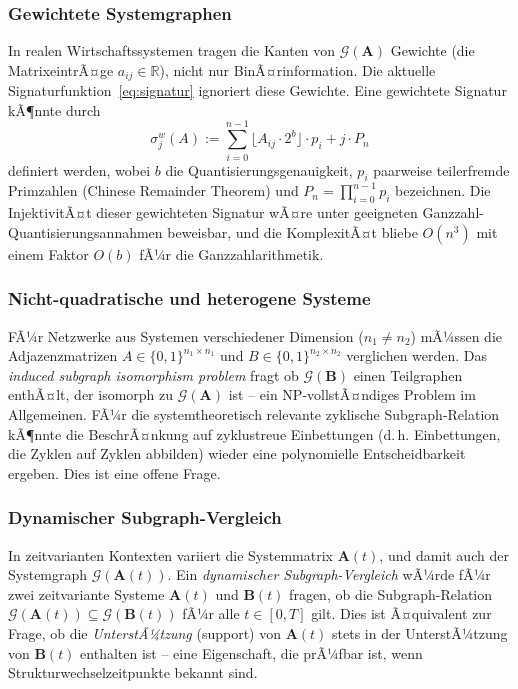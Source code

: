 ﻿\documentclass[12pt, a4paper, titlepage]{report}
\theoremstyle{definition}
\theoremstyle{remark}
\newcommand{\R}{\mathbb{R}}
\newcommand{\vA}{\bm{A}}
\newcommand{\vB}{\bm{B}}
\begin{document}
\subsubsection*{Gewichtete Systemgraphen}

In realen Wirtschaftssystemen tragen die Kanten von $\mathcal{G}(\vA)$ Gewichte
(die MatrixeintrÃ¤ge $a_{ij} \in \R$), nicht nur BinÃ¤rinformation. Die aktuelle
Signaturfunktion~\eqref{eq:signatur} ignoriert diese Gewichte. Eine gewichtete
Signatur kÃ¶nnte durch
\begin{equation}
  \sigma_j^w(A) := \sum_{i=0}^{n-1} \lfloor A_{ij} \cdot 2^b \rfloor \cdot p_i + j \cdot P_n
  \label{eq:weight_sig}
\end{equation}
definiert werden, wobei $b$ die Quantisierungsgenauigkeit, $p_i$ paarweise teilerfremde
Primzahlen (Chinese Remainder Theorem) und $P_n = \prod_{i=0}^{n-1} p_i$ bezeichnen.
Die InjektivitÃ¤t dieser gewichteten Signatur wÃ¤re unter geeigneten Ganzzahl-
Quantisierungsannahmen beweisbar, und die KomplexitÃ¤t bliebe $O(n^3)$ mit einem
Faktor $O(b)$ fÃ¼r die Ganzzahlarithmetik.

\subsubsection*{Nicht-quadratische und heterogene Systeme}

FÃ¼r Netzwerke aus Systemen verschiedener Dimension ($n_1 \neq n_2$) mÃ¼ssen die
Adjazenzmatrizen $A \in \{0,1\}^{n_1 \times n_1}$ und $B \in \{0,1\}^{n_2 \times n_2}$
verglichen werden. Das \emph{induced subgraph isomorphism problem} fragt ob
$\mathcal{G}(\vB)$ einen Teilgraphen enthÃ¤lt, der isomorph zu $\mathcal{G}(\vA)$ ist --
ein NP-vollstÃ¤ndiges Problem im Allgemeinen. FÃ¼r die systemtheoretisch relevante
zyklische Subgraph-Relation kÃ¶nnte die BeschrÃ¤nkung auf zyklustreue Einbettungen
(d.\,h. Einbettungen, die Zyklen auf Zyklen abbilden) wieder eine polynomielle
Entscheidbarkeit ergeben. Dies ist eine offene Frage.

\subsubsection*{Dynamischer Subgraph-Vergleich}

In zeitvarianten Kontexten variiert die Systemmatrix $\vA(t)$, und damit auch
der Systemgraph $\mathcal{G}(\vA(t))$. Ein \emph{dynamischer Subgraph-Vergleich}
wÃ¼rde fÃ¼r zwei zeitvariante Systeme $\vA(t)$ und $\vB(t)$ fragen, ob die
Subgraph-Relation $\mathcal{G}(\vA(t)) \subseteq \mathcal{G}(\vB(t))$ fÃ¼r alle
$t \in [0, T]$ gilt. Dies ist Ã¤quivalent zur Frage, ob die \emph{UnterstÃ¼tzung}
(support) von $\vA(t)$ stets in der UnterstÃ¼tzung von $\vB(t)$ enthalten ist --
eine Eigenschaft, die prÃ¼fbar ist, wenn Strukturwechselzeitpunkte bekannt sind.
\end{document}
